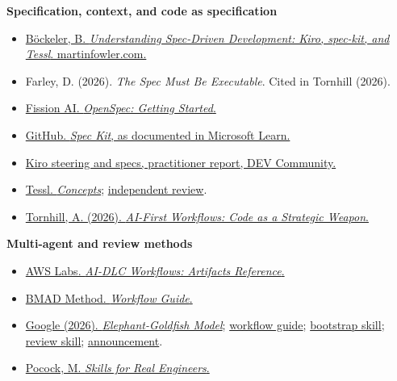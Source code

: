 \documentclass[11pt]{article}
\begin{document}
\textbf{Specification, context, and code as specification}
\begin{itemize}[leftmargin=*]
  \item \href{https://www.martinfowler.com/articles/exploring-gen-ai/sdd-3-tools.html}{B\"ockeler, B. \emph{Understanding Spec-Driven Development: Kiro, spec-kit, and Tessl}. martinfowler.com.}
  \item Farley, D. (2026). \emph{The Spec Must Be Executable}. Cited in Tornhill (2026).
  \item \href{https://openspec.dev/docs/getting-started}{Fission AI. \emph{OpenSpec: Getting Started}.}
  \item \href{https://learn.microsoft.com/en-us/training/modules/spec-driven-development-github-spec-kit-greenfield-intro/8-examine-github-spec-kit-commands-results?pivots=text}{GitHub. \emph{Spec Kit}, as documented in Microsoft Learn.}
  \item \href{https://dev.to/joseph_arriola/abriste-kiro-y-ahora-que-463f}{Kiro steering and specs, practitioner report, DEV Community.}
  \item \href{https://docs.tessl.io/introduction-to-tessl/concepts}{Tessl. \emph{Concepts}}; \href{https://codemyspec.com/blog/tessl-review}{independent review}.
  \item \href{https://adamtornhill.substack.com/p/ai-first-workflows-code-as-a-strategic}{Tornhill, A. (2026). \emph{AI-First Workflows: Code as a Strategic Weapon}.}
\end{itemize}

\textbf{Multi-agent and review methods}
\begin{itemize}[leftmargin=*]
  \item \href{https://awslabs.github.io/aidlc-workflows/guide/14-artifacts-reference/}{AWS Labs. \emph{AI-DLC Workflows: Artifacts Reference}.}
  \item \href{https://git.biohazardvfx.com/Nicholai/BMAD-METHOD/src/tag/v4.4.1/docs/bmad-workflow-guide.md}{BMAD Method. \emph{Workflow Guide}.}
  \item \href{https://egm.dev/}{Google (2026). \emph{Elephant-Goldfish Model}}; \href{https://github.com/google/elephant-goldfish-model/blob/main/docs/getting_started.md}{workflow guide}; \href{https://github.com/google/elephant-goldfish-model/blob/main/skills/egm_bootstrap/SKILL.md}{bootstrap skill}; \href{https://github.com/google/elephant-goldfish-model/blob/main/skills/egm_review/SKILL.md}{review skill}; \href{https://opensource.googleblog.com/2026/10/introducing-elephant-goldfish-model-plugin.html}{announcement}.
  \item \href{https://github.com/mattpocock/skills}{Pocock, M. \emph{Skills for Real Engineers}.}
\end{itemize}
\end{document}
